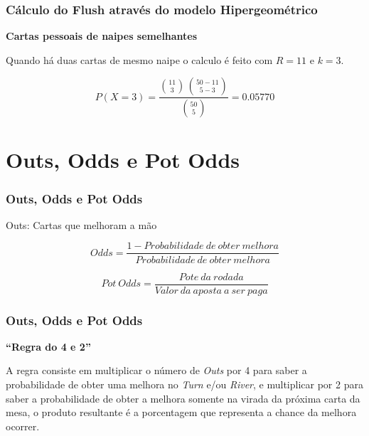 \documentclass{beamer}
\begin{document}
\begin{frame}
\frametitle{Cálculo do Flush através do modelo Hipergeométrico}
\begin{center}
{\Large \textbf{Cartas pessoais de naipes semelhantes}}
\end{center}
Quando há duas cartas de mesmo naipe o calculo é feito com $R = 11$ e $k = 3$.	

\begin{equation}
\displaystyle P(X = 3) = \dfrac{\binom{11}{3}\,\binom{50 - 11}{5 - 3}}{{50 \choose 5}} = 0.05770
\end{equation}

\end{frame}


\section{Outs, Odds e Pot Odds}
\begin{frame}
\frametitle{Outs, Odds e Pot Odds}
\begin{center}
	Outs: Cartas que melhoram a mão
	
	\begin{equation*}
	Odds = \frac{1 - Probabilidade\ de\ obter\ melhora}{Probabilidade\ de\ obter\ melhora}
	\end{equation*}
	
	\begin{equation*}
	Pot\ Odds = \frac{Pote\ da\ rodada}{Valor\ da\ aposta\ a\ ser\ paga}
	\end{equation*}
\end{center}
\end{frame}

\begin{frame}
	\frametitle{Outs, Odds e Pot Odds}
\begin{center}
{\Large \textbf{``Regra do 4 e 2''}}
\end{center}
A regra consiste em multiplicar o número de \textit{Outs} por 4 para saber a probabilidade de obter uma melhora no \textit{Turn} e/ou \textit{River}, e multiplicar por 2 para saber a probabilidade de obter a melhora somente na virada da próxima carta da mesa, o produto resultante é a porcentagem que representa a chance da melhora ocorrer.
\end{frame}
\end{document}
